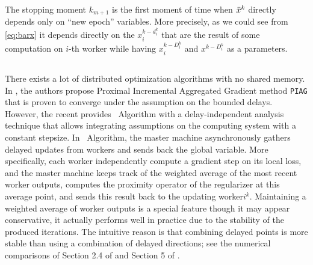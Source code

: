 The stopping moment $k_{m+1}$ is the first moment of time when $\bar{x}^k$ directly depends only on ``new epoch'' variables. More precisely, as we could see from \eqref{eq:barx} it depends directly on the $x_i^{k-d_i^k}$ that are the result of some computation on $i$-th worker while having $x_i^{k-D_i^k}$ and $x^{k-D_i^k}$ as a parameters.




\subsection{\dave}\label{sec:basics_dave}

There exists a lot of distributed optimization algorithms with no shared memory. In \cite{vanli2016stronger}, the authors propose Proximal Incremental Aggregated Gradient method \texttt{PIAG} that is proven to converge under the assumption on the bounded delays. However, the recent \cite{mishchenko2018} provides \dave~Algorithm with a delay-independent analysis technique that allows integrating assumptions on the computing system with a constant stepsize. In \dave~Algorithm, the master machine asynchronously gathers delayed updates from workers and sends back the global variable. More specifically, each worker independently compute a gradient step on its local loss, and the master machine keeps track of the weighted average of the most recent worker outputs, computes the proximity operator of the regularizer at this average point, and sends this result back to the updating worker\;$i^k$.  Maintaining a weighted average of worker outputs is a special feature  \dave\dg{;} though it may appear conservative, it actually performs well in practice due to the stability of the produced iterations.  The intuitive reason is that combining delayed points is more stable than using a combination of delayed directions; see the numerical comparisons of Section 2.4 of \cite{mishchenko2018} and Section 5 of \cite{ICML18}.

